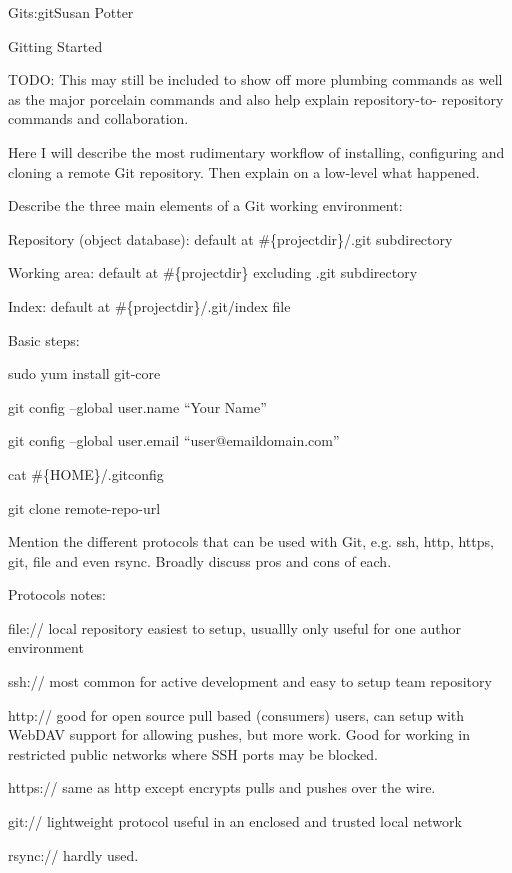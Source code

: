 \begin{aosachapter}{Git}{s:git}{Susan Potter}
\begin{aosasect1}{Gitting Started}

TODO: This may still be included to show off more plumbing commands as well
as the major porcelain commands and also help explain repository-to-
repository commands and collaboration.

Here I will describe the most rudimentary workflow of installing, configuring
and cloning a remote Git repository. Then explain on a low-level what
happened.

Describe the three main elements of a Git working environment:
\begin{aosaitemize}
  \item Repository (object database): default at \#\{projectdir\}/.git
  subdirectory
  \item Working area: default at \#\{projectdir\} excluding .git subdirectory
  \item Index: default at \#\{projectdir\}/.git/index file
\end{aosaitemize}

Basic steps:
\begin{aosaitemize}
  \item sudo yum install git-core
  \item git config --global user.name ``Your Name''
  \item git config --global user.email ``user@emaildomain.com''
  \item cat \#\{HOME\}/.gitconfig
  \item git clone remote-repo-url
\end{aosaitemize}

Mention the different protocols that can be used with Git, e.g. ssh, http,
https, git, file and even rsync. Broadly discuss pros and cons of each.

Protocols notes:
\begin{aosaitemize}
  \item file:// local repository easiest to setup, usuallly only useful for
    one author environment
  \item ssh:// most common for active development and easy to setup team
  repository
  \item http:// good for open source pull based (consumers) users, can setup
  with WebDAV support for allowing pushes, but more work. Good for working in
  restricted public networks where SSH ports may be blocked.
  \item https:// same as http except encrypts pulls and pushes over the wire.
  \item git:// lightweight protocol useful in an enclosed and trusted local
  network
  \item rsync:// hardly used.
\end{aosaitemize}


\end{aosasect1}
\end{aosachapter}
